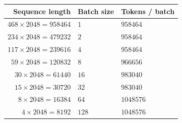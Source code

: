 \begin{tabular}{rll}
\hline
\textbf{Sequence length} & \textbf{Batch size} & \textbf{Tokens / batch} \\
\hline
\textbf{$468\times 2048=958464$} & $1$ & $958464$ \\
\textbf{$234\times 2048=479232$} & $2$ & $958464$ \\
\textbf{$117\times 2048=239616$} & $4$ & $958464$ \\
\textbf{$59\times 2048=120832$} & $8$ & $966656$ \\
\textbf{$30\times 2048=61440$} & $16$ & $983040$ \\
\textbf{$15\times 2048=30720$} & $32$ & $983040$ \\
\textbf{$8\times 2048=16384$} & $64$ & $1048576$ \\
\textbf{$4\times 2048=8192$} & $128$ & $1048576$ \\
\hline
\end{tabular}
